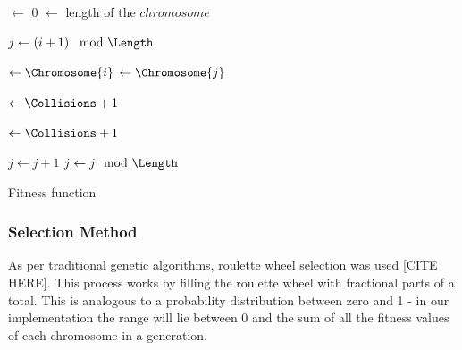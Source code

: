 \documentclass{sig-alternate}
\begin{document}
\begin{algorithm}[t!]
  \SetAlgoLined
  \DontPrintSemicolon
  
  {
    \BlankLine
    
    \Collisions $\leftarrow$ 0\;
    \Length $\leftarrow$ length of the $chromosome$\;
    \BlankLine
    
    {
      $j \leftarrow \left( i + 1 \right) \mod{\Length}$\;
      {
        \Yi $\leftarrow \Chromosome{i}$\;
        \Yj $\leftarrow \Chromosome{j}$\;
        \BlankLine
        
        \If{\Yi == \Yj}
        {
          \Collisions $\leftarrow \Collisions + 1$\; 
        }
        \BlankLine
        
        {
          \Collisions $\leftarrow \Collisions + 1$\;
        }
        \BlankLine
        
        $j \leftarrow j + 1$\;
        $j \leftarrow j \mod{\Length}$\;
      }
    }
    \BlankLine

    {
      \;
    }
    {
      \;
    }
  }
\caption{Fitness function}
\label{alg:fitness}
\end{algorithm}


\subsubsection{Selection Method}
As per traditional genetic algorithms, roulette wheel selection was used [CITE HERE]. This process works by filling the roulette wheel with fractional parts of a total. This is analogous to a probability distribution between zero and 1 - in our implementation the range will lie between 0 and the sum of all the fitness values of each chromosome in a generation.
\end{document}
